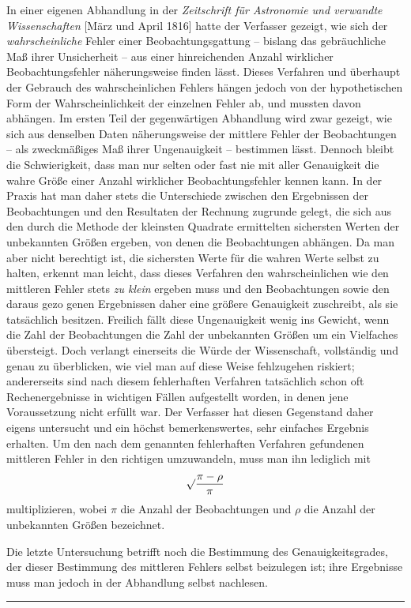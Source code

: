 In einer eigenen Abhandlung in der \textit{Zeitschrift für Astronomie und verwandte Wissenschaften} [März und April 1816] hatte der Verfasser gezeigt, wie sich der \textit{wahrscheinliche} Fehler einer Beobachtungsgattung – bislang das gebräuchliche Maß ihrer Unsicherheit – aus einer hinreichenden Anzahl wirklicher Beobachtungsfehler näherungsweise finden lässt. Dieses Verfahren und überhaupt der Gebrauch des wahrscheinlichen Fehlers hängen jedoch von der hypothetischen Form der Wahrscheinlichkeit der einzelnen Fehler ab, und mussten davon abhängen. Im ersten Teil der gegenwärtigen Abhandlung wird zwar gezeigt, wie sich aus denselben Daten näherungsweise der mittlere Fehler der Beobachtungen – als zweckmäßiges Maß ihrer Ungenauigkeit – bestimmen lässt. Dennoch bleibt die Schwierigkeit, dass man nur selten oder fast nie mit aller Genauigkeit die wahre Größe einer Anzahl wirklicher Beobachtungsfehler kennen kann. In der Praxis hat man daher stets die Unterschiede zwischen den Ergebnissen der Beobachtungen und den Resultaten der Rechnung zugrunde gelegt, die sich aus den durch die Methode der kleinsten Quadrate ermittelten sichersten Werten der unbekannten Größen ergeben, von denen die Beobachtungen abhängen. Da man aber nicht berechtigt ist, die sichersten Werte für die wahren Werte selbst zu halten, erkennt man leicht, dass dieses Verfahren den wahrscheinlichen wie den mittleren Fehler stets \textit{zu klein} ergeben muss und den Beobachtungen sowie den daraus gezo%
genen Ergebnissen daher eine größere Genauigkeit zuschreibt, als sie tatsächlich besitzen. Freilich fällt diese Ungenauigkeit wenig ins Gewicht, wenn die Zahl der Beobachtungen die Zahl der unbekannten Größen um ein Vielfaches übersteigt. Doch verlangt einerseits die Würde der Wissenschaft, vollständig und genau zu überblicken, wie viel man auf diese Weise fehlzugehen riskiert; andererseits sind nach diesem fehlerhaften Verfahren tatsächlich schon oft Rechenergebnisse in wichtigen Fällen aufgestellt worden, in denen jene Voraussetzung nicht erfüllt war. Der Verfasser hat diesen Gegenstand daher eigens untersucht und ein höchst bemerkenswertes, sehr einfaches Ergebnis erhalten. Um den nach dem genannten fehlerhaften Verfahren gefundenen mittleren Fehler in den richtigen umzuwandeln, muss man ihn lediglich mit
\[
\surd\frac{\pi-\rho}{\pi}
\]
multiplizieren, wobei \(\pi\) die Anzahl der Beobachtungen und \(\rho\) die Anzahl der unbekannten Größen bezeichnet.

Die letzte Untersuchung betrifft noch die Bestimmung des Genauigkeitsgrades, der dieser Bestimmung des mittleren Fehlers selbst beizulegen ist; ihre Ergebnisse muss man jedoch in der Abhandlung selbst nachlesen.
\par\bigskip
\begin{center}
\rule{.88\textwidth}{.3pt}\par
\end{center}
